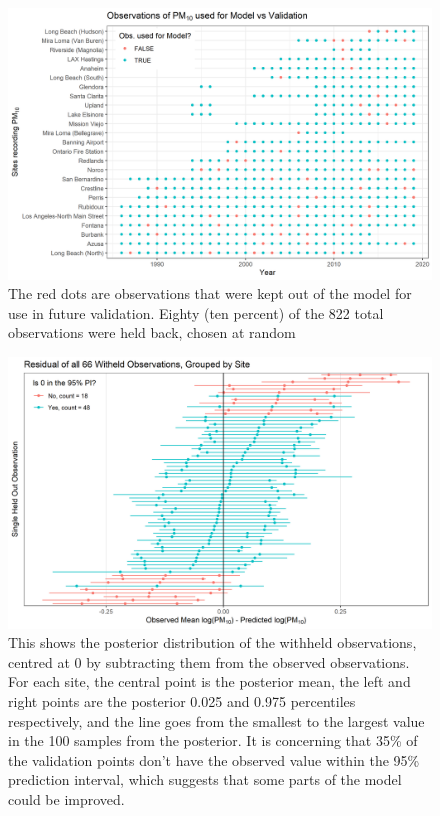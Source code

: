 \begin{figure}[ht]
	\centering
	\includegraphics[width = \textwidth]{Figures/Validation/validate_dotplot.png}
	\caption{The red dots are observations that were kept out of the model for use in future validation.  Eighty (ten percent) of the 822 total observations were held back, chosen at random}
	\label{fig:validate_dotplot}
\end{figure}

\begin{figure}[ht]
	\centering
	\includegraphics[width = \textwidth]{Figures/Validation/validate_delta_mean.png}
	\caption{This shows the posterior distribution of the withheld observations, centred at 0 by subtracting them from the observed observations.  For each site, the central point is the posterior mean, the left and right points are the posterior 0.025 and 0.975 percentiles respectively, and the line goes from the smallest to the largest value in the 100 samples from the posterior.  It is concerning that 35\% of the validation points don't have the observed value within the 95\% prediction interval, which suggests that some parts of the model could be improved.}
	\label{fig:validate_delta_mean}
\end{figure}

